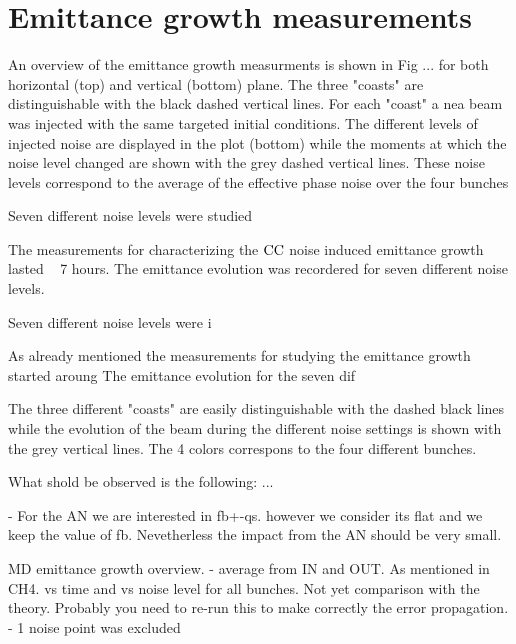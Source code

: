 \section{Emittance growth measurements}\label{sec:EmitGrowth_measurements}

An overview of the emittance growth measurments is shown in Fig ... for both horizontal (top) and vertical (bottom) plane. The three "coasts" are distinguishable with the black dashed vertical lines. For each "coast" a nea beam was injected with the same targeted initial conditions. The different levels of injected noise are displayed in the plot (bottom) while the moments at which the noise level changed are shown with the grey dashed vertical lines. These noise levels correspond to the average of the effective phase noise over the four bunches



Seven different noise levels were studied

The measurements for characterizing the ${\mathrm{CC}}$ noise induced emittance growth lasted ~ 7 hours. The emittance evolution was recordered for seven different noise levels. 

Seven different noise levels were i


As already mentioned the measurements for studying the emittance growth started aroung
The emittance evolution for the seven dif

The three different "coasts" are easily distinguishable with the dashed black lines while the evolution of the beam during the different noise settings is shown with the grey vertical lines. The 4 colors correspons to the four different bunches. 

What shold be observed is the following: ...



- For the AN we are interested in fb+-qs. however we consider its flat and we keep the value of fb. Nevetherless the impact from the AN should be very small.

MD emittance growth overview. 
    - average from IN and OUT. As mentioned in CH4. vs time and vs noise level for all bunches. Not yet comparison with the theory. Probably you need to re-run this to make correctly the error propagation. 
    - 1 noise point was excluded
 


